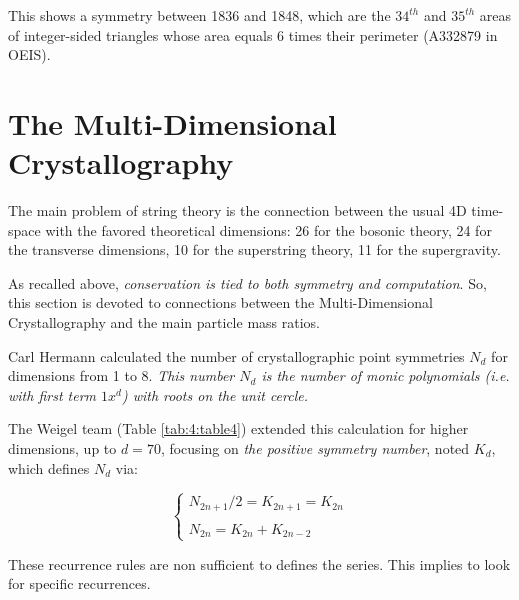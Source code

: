 \documentclass[a4paper,9pt]{article}
\begin{document}
This shows a symmetry between 1836 and 1848, which are the $34^{th}$ and $35^{th}$ areas of integer-sided triangles whose area equals 6 times their perimeter (A332879 in OEIS).


\section{The Multi-Dimensional Crystallography}

The main problem of string theory is the connection between the usual 4D time-space with the favored theoretical dimensions: 26 for the bosonic theory, 24 for the transverse dimensions, 10 for the superstring theory, 11 for the supergravity. 

As recalled above, \textit{conservation is tied to both symmetry and computation}. So, this section is devoted to connections between the Multi-Dimensional Crystallography and the main particle mass ratios.

Carl Hermann \cite {Hermann} calculated the number of crystallographic point symmetries $N_d$ for dimensions from 1 to 8. \textit{This number $N_d$ is the number of monic polynomials (i.e. with first term $1x^d$) with roots on the unit cercle.}


The Weigel team\cite{Weigel} (Table \ref{tab:4:table4}) extended this calculation for higher dimensions, up to $d=70$, focusing on \textit{the positive symmetry number}, noted $K_{d}$, which defines $N_d$ via: 

\begin{equation}\label{Eq22}
 \left\{
    \begin{array}{ll}
            N_{2n+1}/2 =  K_{2n+1} =  K_{2n} \\
            \\
          N_{2n} = K_{2n} + K_{2n-2}
    \end{array}
\right.
\end{equation}

These recurrence rules are non sufficient to defines the series. This implies to look for specific recurrences.
\end{document}
